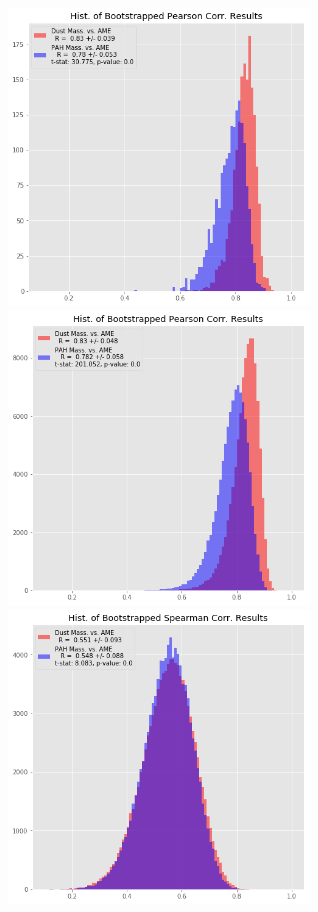 \documentclass[preprint2,longabstract]{aastex}
\begin{document}
\begin{figure}
\label{fig:AME_boostrap_mass_regs_all}
\includegraphics[width=80mm]{../Plots/AMEregs_bootstrap_mass_pearson_PCXV.png}
\includegraphics[width=80mm]{../Plots/AMEregs_bootstrap_mass_pearson_PR2.png}
\includegraphics[width=80mm]{../Plots/AMEregs_bootstrap_mass_spearman_PR2.png}

\end{figure}
\end{document}
